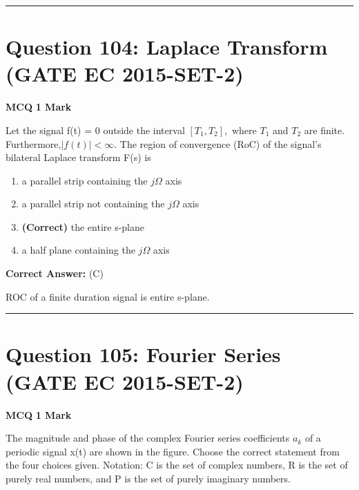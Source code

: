 \documentclass[11pt,a4paper]{article}
\begin{document}
\vspace{1.5em}
\hrule
\vspace{1.5em}

\section*{Question 104: Laplace Transform (GATE EC 2015-SET-2)}
\noindent \textbf{\color{primary}MCQ} \hfill \textbf{\color{secondary}1 Mark}


\noindent Let the signal f(t) = 0 outside the interval $[T_{1}, T_{2}],$ where $T_{1}$ and $T_{2}$ are finite. Furthermore,$|f(t)| < \infty$. The region of convergence (RoC) of the signal's bilateral Laplace transform F(s) is


\begin{enumerate}[label=(\Alph*)]
    \item a parallel strip containing the $j\Omega$ axis
    \item a parallel strip not containing the $j\Omega$ axis
    \item \textbf{(Correct)} the entire s-plane
    \item a half plane containing the $j\Omega$ axis
\end{enumerate}

\noindent \textbf{Correct Answer:} (C)

\begin{tcolorbox}[solbox, title=Detailed Solution -- Question 104]
ROC of a finite duration signal is entire s-plane.
\end{tcolorbox}

\vspace{1.5em}
\hrule
\vspace{1.5em}

\section*{Question 105: Fourier Series (GATE EC 2015-SET-2)}
\noindent \textbf{\color{primary}MCQ} \hfill \textbf{\color{secondary}1 Mark}


\noindent The magnitude and phase of the complex Fourier series coefficients $a_{k}$ of a periodic signal x(t) are shown in the figure. Choose the correct statement from the four choices given. Notation: C is the set of complex numbers, R is the set of purely real numbers, and P is the set of purely imaginary numbers.
\end{document}
